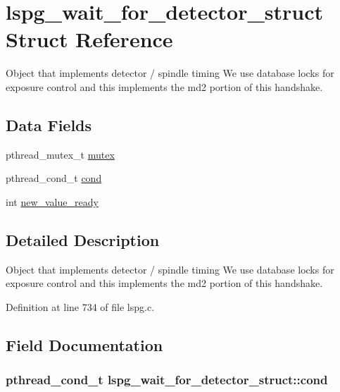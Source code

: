 \hypertarget{structlspg__wait__for__detector__struct}{\section{lspg\-\_\-wait\-\_\-for\-\_\-detector\-\_\-struct Struct Reference}
\label{structlspg__wait__for__detector__struct}
}


Object that implements detector / spindle timing We use database locks for exposure control and this implements the md2 portion of this handshake.  


\subsection*{Data Fields}
\begin{DoxyCompactItemize}
\item 
pthread\-\_\-mutex\-\_\-t \hyperlink{structlspg__wait__for__detector__struct_a958e9fe59e671e61f95c2ce796ba24ce}{mutex}
\item 
pthread\-\_\-cond\-\_\-t \hyperlink{structlspg__wait__for__detector__struct_aa97388f93ca5099196ba0da1e4a5b7bb}{cond}
\item 
int \hyperlink{structlspg__wait__for__detector__struct_ad950e85c70c4473c5c7c40f8ceeae61d}{new\-\_\-value\-\_\-ready}
\end{DoxyCompactItemize}


\subsection{Detailed Description}
Object that implements detector / spindle timing We use database locks for exposure control and this implements the md2 portion of this handshake. 

Definition at line 734 of file lspg.\-c.



\subsection{Field Documentation}
\hypertarget{structlspg__wait__for__detector__struct_aa97388f93ca5099196ba0da1e4a5b7bb}{
\subsubsection[{cond}]{\setlength{\rightskip}{0pt plus 5cm}pthread\-\_\-cond\-\_\-t lspg\-\_\-wait\-\_\-for\-\_\-detector\-\_\-struct\-::cond}}\label{structlspg__wait__for__detector__struct_aa97388f93ca5099196ba0da1e4a5b7bb}


